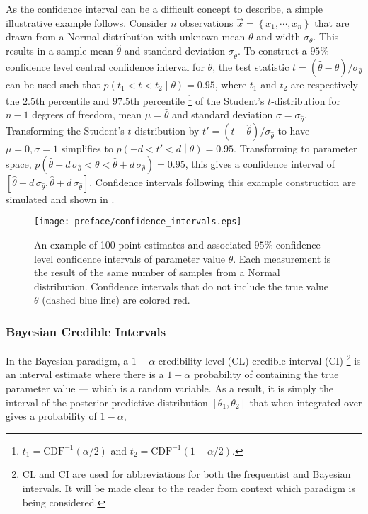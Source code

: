 As the confidence interval can be a difficult concept to describe, a simple illustrative example follows.
Consider $n$ observations $\vec{x} = \left\{x_{1}, \cdots, x_{n}\right\}$ that are drawn from a Normal distribution with unknown mean $\theta$ and width $\sigma_{\theta}$.
This results in a sample mean $\hat{\theta}$ and standard deviation $\sigma_{\hat{\theta}}$.
To construct a $95\%$ confidence level central confidence interval for $\theta$, the test statistic $t = \left(\hat{\theta} - \theta\right)/\sigma_{\hat{\theta}}$ can be used such that ${p\left(t_{1} < t < t_{2}\middle|\theta\right) = 0.95}$, where $t_{1}$ and $t_{2}$ are respectively the $2.5$th percentile and $97.5$th percentile%
\footnote{$t_{1} = \mathrm{CDF}^{-1}\left(\alpha/2\right)$ and $t_{2} = \mathrm{CDF}^{-1}\left(1 - \alpha/2\right)$.}
of the Student's $t$-distribution for $n-1$ degrees of freedom, mean $\mu=\hat{\theta}$ and standard deviation $\sigma=\sigma_{\hat{\theta}}$.
Transforming the Student's $t$-distribution by $t' = \left(t-\hat{\theta}\right)/\sigma_{\hat{\theta}}$ to have $\mu=0, \sigma=1$ simplifies to ${p\left(-d < t' < d\middle|\theta\right) = 0.95}$.
Transforming to parameter space, ${p\left(\hat{\theta} - d\, \sigma_{\hat{\theta}} < \theta < \hat{\theta} + d\, \sigma_{\hat{\theta}}\right)  = 0.95}$, this gives a confidence interval of $\left[\hat{\theta} - d\, \sigma_{\hat{\theta}}, \hat{\theta} + d\, \sigma_{\hat{\theta}}\right]$.
Confidence intervals following this example construction are simulated and shown in .

\begin{figure}[htbp]
 \centering
 \texttt{[image: preface/confidence\_intervals.eps]}
 \caption[Simulation of 100 $95\%$ confidence level confidence intervals]{%
  An example of 100 point estimates and associated $95\%$ confidence level confidence intervals of parameter value $\theta$.
  Each measurement is the result of the same number of samples from a Normal distribution.
  Confidence intervals that do not include the true value $\theta$ (dashed blue line) are colored red.}
 \label{fig:confidence_intervals}
\end{figure}

\subsubsection{Bayesian Credible Intervals}

In the Bayesian paradigm, a $1-\alpha$ credibility level (CL) credible interval (CI)%
\footnote{CL and CI are used for abbreviations for both the frequentist and Bayesian intervals.
 It will be made clear to the reader from context which paradigm is being considered.}
is an interval estimate where there is a $1-\alpha$ probability of containing the true parameter value --- which is a random variable.
As a result, it is simply the interval of the posterior predictive distribution $\left[\theta_{1}, \theta_{2}\right]$ that when integrated over gives a probability of $1-\alpha$,

